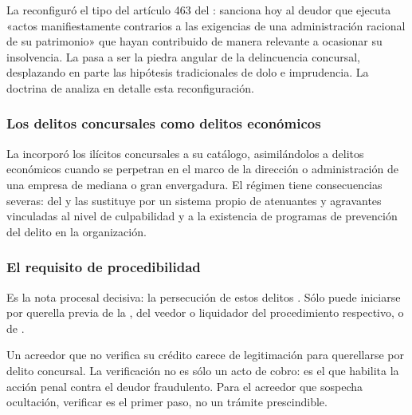 \begin{foco}
La \Ldeleco{} \citeyearpar{ley-21595} reconfiguró el tipo del artículo 463 del \cpen{}: sanciona hoy al
deudor que ejecuta «actos manifiestamente contrarios a las exigencias de una administración
racional de su patrimonio» que hayan contribuido de manera relevante a ocasionar su
insolvencia. La  pasa a ser la piedra
angular de la delincuencia concursal, desplazando en parte las hipótesis tradicionales de dolo
e imprudencia. La doctrina de \textcite{mayer-delitos-concursales} analiza en detalle esta
reconfiguración.
\end{foco}


\subsubsection{Los delitos concursales como delitos económicos}

La \Ldeleco{} \citeyearpar{ley-21595} incorporó los ilícitos concursales a su catálogo,
asimilándolos a delitos económicos  cuando se perpetran en el
marco de la dirección o administración de una empresa de mediana o gran envergadura. El régimen
tiene consecuencias severas:  del
\cpen{} y las sustituye por un sistema propio de atenuantes y agravantes vinculadas al nivel de
culpabilidad y a la existencia de programas de prevención del delito en la organización.

\subsubsection{El requisito de procedibilidad}

Es la nota procesal decisiva: la persecución de estos delitos .
Sólo puede iniciarse por querella previa de la \superir{}, del veedor o liquidador del
procedimiento respectivo, o de .

\begin{foco}
Un acreedor que no verifica su crédito carece de legitimación para querellarse por delito
concursal. La verificación no es sólo un acto de cobro: es el que habilita la acción penal
contra el deudor fraudulento. Para el acreedor que sospecha ocultación, verificar es el
primer paso, no un trámite prescindible.
\end{foco}

